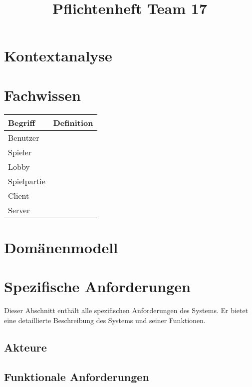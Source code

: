 \documentclass{uulm-assignment}
\title{Pflichtenheft Team 17}
\begin{document}
\maketitle

\listoftodos

\section{Kontextanalyse}



\section{Fachwissen}


\begin{tabularx}{16cm}{l|X}
\textbf{Begriff} & \textbf{Definition} \\
\hline
Benutzer & \\ 
\hline
Spieler & \\ 
\hline
Lobby & \\ 
\hline
Spielpartie & \\ 
\hline
Client & \\ 
\hline
Server & \\ 
\end{tabularx}


\section{Domänenmodell}







\section{Spezifische Anforderungen}
Dieser Abschnitt enthält alle spezifischen Anforderungen des Systems. Er bietet eine detaillierte
Beschreibung des Systems und seiner Funktionen.


\subsection{Akteure}



\subsection{Funktionale Anforderungen}
\end{document}
